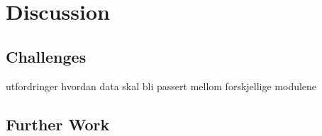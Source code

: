 \chapter{Discussion}

\section{Challenges}
utfordringer
hvordan data skal bli passert mellom forskjellige modulene

\section{Further Work}


